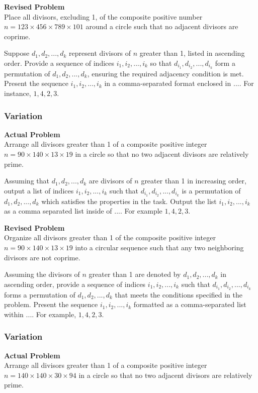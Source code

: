 \textbf{Revised Problem}\\
Place all divisors, excluding 1, of the composite positive number $n = 123 \times 456 \times 789 \times 101$ around a circle such that no adjacent divisors are coprime.

Suppose $d_1, d_2, ..., d_k$ represent divisors of $n$ greater than 1, listed in ascending order. Provide a sequence of indices $i_1, i_2, ..., i_k$ so that $d_{i_1}, d_{i_2}, ..., d_{i_k}$ form a permutation of $d_1, d_2, ..., d_k$, ensuring the required adjacency condition is met. Present the sequence $i_1, i_2, ..., i_k$ in a comma-separated format enclosed in $\boxed{...}$. For instance, $\boxed{1, 4, 2, 3}$.

\subsubsection{Variation}
\textbf{Actual Problem}\\
Arrange all divisors greater than 1 of a composite positive integer $n = 90 \times 140 \times 13 \times 19$ in a circle so that no two adjacent divisors are relatively prime.

Assuming that $d_1, d_2, ..., d_k$ are divisors of $n$ greater than 1 in increasing order, output a list of indices $i_1, i_2, ..., i_k$ such that $d_{i_1}, d_{i_2}, ..., d_{i_k}$ is a permutation of $d_1, d_2, ..., d_k$ which satisfies the properties in the task.
Output the list $i_1, i_2, ..., i_k$ as a comma separated list inside of $\boxed{...}$. For example $\boxed{1, 4, 2, 3}$.

\textbf{Revised Problem}\\
Organize all divisors greater than 1 of the composite positive integer $n = 90 \times 140 \times 13 \times 19$ into a circular sequence such that any two neighboring divisors are not coprime.

Assuming the divisors of $n$ greater than 1 are denoted by $d_1, d_2, ..., d_k$ in ascending order, provide a sequence of indices $i_1, i_2, ..., i_k$ such that $d_{i_1}, d_{i_2}, ..., d_{i_k}$ forms a permutation of $d_1, d_2, ..., d_k$ that meets the conditions specified in the problem. Present the sequence $i_1, i_2, ..., i_k$ formatted as a comma-separated list within $\boxed{...}$. For example, $\boxed{1, 4, 2, 3}$.

\subsubsection{Variation}
\textbf{Actual Problem}\\
Arrange all divisors greater than 1 of a composite positive integer $n = 140 \times 140 \times 30 \times 94$ in a circle so that no two adjacent divisors are relatively prime.

